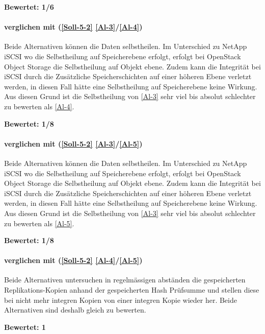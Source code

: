 \textbf{Bewertet: 1/6}

\paragraph*{  verglichen mit  (\ref{Soll-5-2} \ref{Al-3}/\ref{Al-4})}
Beide Alternativen können die Daten selbstheilen. Im Unterschied zu NetApp iSCSI wo die Selbstheilung auf Speicherebene erfolgt, erfolgt bei OpenStack Object Storage die Selbstheilung auf Objekt ebene. Zudem kann die Integrität bei iSCSI durch die Zusätzliche Speicherschichten auf einer höheren Ebene verletzt werden, in diesen Fall hätte eine Selbstheilung auf Speicherebene keine Wirkung. Aus diesen Grund ist die Selbstheilung von  \ref{Al-3} sehr viel bis absolut schlechter zu bewerten als  \ref{Al-4}.

\textbf{Bewertet: 1/8}

\paragraph*{  verglichen mit  (\ref{Soll-5-2} \ref{Al-3}/\ref{Al-5})}
Beide Alternativen können die Daten selbstheilen. Im Unterschied zu NetApp iSCSI wo die Selbstheilung auf Speicherebene erfolgt, erfolgt bei OpenStack Object Storage die Selbstheilung auf Objekt ebene. Zudem kann die Integrität bei iSCSI durch die Zusätzliche Speicherschichten auf einer höheren Ebene verletzt werden, in diesen Fall hätte eine Selbstheilung auf Speicherebene keine Wirkung. Aus diesen Grund ist die Selbstheilung von  \ref{Al-3} sehr viel bis absolut schlechter zu bewerten als  \ref{Al-5}.

\textbf{Bewertet: 1/8}


\paragraph*{  verglichen mit  (\ref{Soll-5-2} \ref{Al-4}/\ref{Al-5})}
Beide Alternativen untersuchen in regelmässigen abständen die gespeicherten Replikations-Kopien anhand der gespeicherten Hash Prüfsumme und stellen diese bei nicht mehr integren Kopien von einer integren Kopie wieder her. Beide Alternativen sind deshalb gleich zu bewerten.

\textbf{Bewertet: 1}


